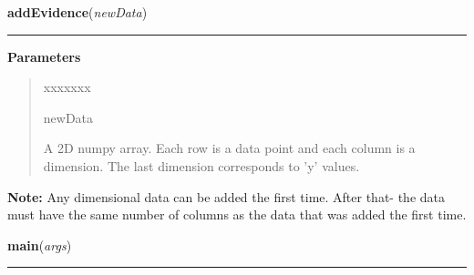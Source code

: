     \label{QSTK:qstklearn:parallelknn:addEvidence}

    \vspace{0.5ex}

\hspace{.8\funcindent}\begin{boxedminipage}{\funcwidth}

    \raggedright \textbf{addEvidence}(\textit{newData})

    \vspace{-1.5ex}

    \rule{\textwidth}{0.5\fboxrule}
\setlength{\parskip}{2ex}
\setlength{\parskip}{1ex}
      \textbf{Parameters}
      \vspace{-1ex}

      \begin{quote}
        \begin{Ventry}{xxxxxxx}

          \item[newData]

          A 2D numpy array. Each row is a data point and each column is a 
          dimension. The last dimension corresponds to 'y' values.

        \end{Ventry}

      \end{quote}

\textbf{Note:} Any dimensional data can be added the first time. After that- the data must
have the same number of columns as the data that was added the first time.



    \end{boxedminipage}

    \label{QSTK:qstklearn:parallelknn:main}

    \vspace{0.5ex}

\hspace{.8\funcindent}\begin{boxedminipage}{\funcwidth}

    \raggedright \textbf{main}(\textit{args})

    \vspace{-1.5ex}

    \rule{\textwidth}{0.5\fboxrule}
\setlength{\parskip}{2ex}
\setlength{\parskip}{1ex}
    \end{boxedminipage}


